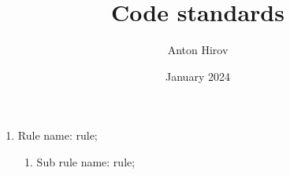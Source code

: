 \documentclass[12pt,a4paper,twoside,BCOR=5.8mm,DIV=15]{scrreprt}
\title{Code standards}
\author{Anton Hirov}
\date{January 2024}
\begin{document}
\maketitle

\begin{enumerate}
    \item Rule name: rule;
    \begin{enumerate}
        \item Sub rule name: rule;
    \end{enumerate}
\end{enumerate}
\end{document}
